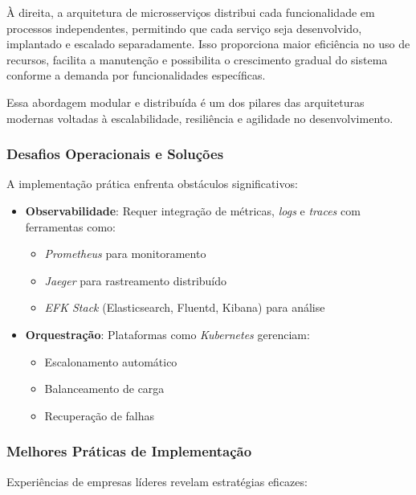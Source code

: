 À direita, a arquitetura de microsserviços distribui cada funcionalidade em processos independentes, permitindo que cada serviço seja desenvolvido, implantado e escalado separadamente. Isso proporciona maior eficiência no uso de recursos, facilita a manutenção e possibilita o crescimento gradual do sistema conforme a demanda por funcionalidades específicas.

Essa abordagem modular e distribuída é um dos pilares das arquiteturas modernas voltadas à escalabilidade, resiliência e agilidade no desenvolvimento.

\subsubsection{Desafios Operacionais e Soluções}
A implementação prática enfrenta obstáculos significativos:

\begin{itemize}
    \item \textbf{Observabilidade}: Requer integração de métricas, \textit{logs} e \textit{traces} com ferramentas como:
    \begin{itemize}
        \item \textit{Prometheus} para monitoramento
        \item \textit{Jaeger} para rastreamento distribuído
        \item \textit{EFK Stack} (Elasticsearch, Fluentd, Kibana) para análise
    \end{itemize}
    
    \item \textbf{Orquestração}: Plataformas como \textit{Kubernetes} gerenciam:
    \begin{itemize}
        \item Escalonamento automático
        \item Balanceamento de carga
        \item Recuperação de falhas
    \end{itemize}
\end{itemize}

\subsubsection{Melhores Práticas de Implementação}
Experiências de empresas líderes revelam estratégias eficazes:

